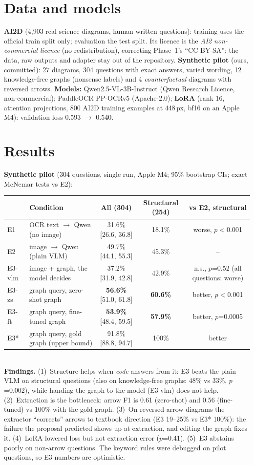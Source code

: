 \documentclass[10pt,letterpaper]{article}
\begin{document}
\section{Data and models}
\textbf{AI2D} (4,903 real science diagrams, human-written questions): training uses the official train split only; evaluation the test split. Its licence is the \emph{AI2 non-commercial licence} (no redistribution), correcting Phase~1's ``CC BY-SA''; the data, raw outputs and adapter stay out of the repository. \textbf{Synthetic pilot} (ours, committed): 27 diagrams, 304 questions with exact answers, varied wording, 12 knowledge-free graphs (nonsense labels) and 4 \emph{counterfactual} diagrams with reversed arrows. \textbf{Models:} Qwen2.5-VL-3B-Instruct (Qwen Research Licence, non-commercial); PaddleOCR PP-OCRv5 (Apache-2.0); \textbf{LoRA} (rank 16, attention projections, 800 AI2D training examples at 448\,px, bf16 on an Apple M4): validation loss 0.593 $\rightarrow$ 0.540.


\section{Results}
\textbf{Synthetic pilot} (304 questions, single run, Apple M4; 95\% bootstrap CIs; exact McNemar tests vs E2):\\[2pt]
{\small\begin{tabularx}{\textwidth}{@{}lLccc@{}}
\toprule
& Condition & All (304) & Structural (254) & vs E2, structural \\
\midrule
E1 & OCR text $\rightarrow$ Qwen (no image) & 31.6\% [26.6, 36.8] & 18.1\% & worse, $p<$0.001 \\
E2 & image $\rightarrow$ Qwen (plain VLM) & 49.7\% [44.1, 55.3] & 45.3\% & -- \\
E3-vlm & image + graph, the model decides & 37.2\% [31.9, 42.8] & 42.9\% & n.s., $p$=0.52 (all questions: worse) \\
E3-zs & graph query, zero-shot graph & \textbf{56.6\%} [51.0, 61.8] & \textbf{60.6\%} & better, $p<$0.001 \\
E3-ft & graph query, fine-tuned graph & \textbf{53.9\%} [48.4, 59.5] & \textbf{57.9\%} & better, $p$=0.0005 \\
E3* & graph query, gold graph (upper bound) & 91.8\% [88.8, 94.7] & 100\% & better \\
\bottomrule
\end{tabularx}}\\[2pt]
\textbf{Findings.} (1)~Structure helps when \emph{code} answers from it: E3 beats the plain VLM on structural questions (also on knowledge-free graphs: 48\% vs 33\%, $p$=0.002), while handing the graph to the model (E3-vlm) does not help. (2)~Extraction is the bottleneck: arrow F1 is 0.61 (zero-shot) and 0.56 (fine-tuned) vs 100\% with the gold graph. (3)~On reversed-arrow diagrams the extractor ``corrects'' arrows to textbook direction (E3 19--25\% vs E3* 100\%): the failure the proposal predicted shows up at extraction, and editing the graph fixes it. (4)~LoRA lowered loss but not extraction error ($p$=0.41). (5)~E3 abstains poorly on non-arrow questions. The keyword rules were debugged on pilot questions, so E3 numbers are optimistic.
\end{document}
